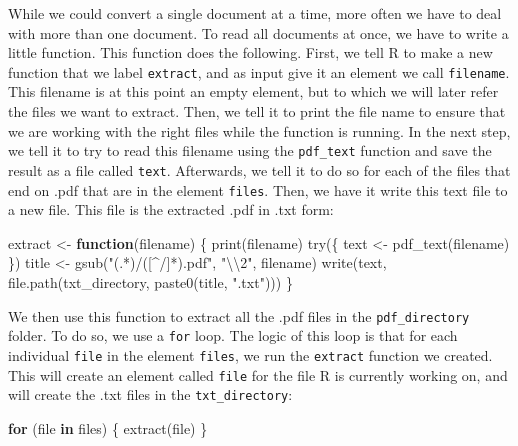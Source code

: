 \documentclass[
]{article}
\newenvironment{Shaded}{\begin{snugshade}}{\end{snugshade}}
\newcommand{\ControlFlowTok}[1]{\textcolor[rgb]{0.13,0.29,0.53}{\textbf{#1}}}
\newcommand{\FunctionTok}[1]{\textcolor[rgb]{0.00,0.00,0.00}{#1}}
\newcommand{\NormalTok}[1]{#1}
\newcommand{\OtherTok}[1]{\textcolor[rgb]{0.56,0.35,0.01}{#1}}
\newcommand{\SpecialCharTok}[1]{\textcolor[rgb]{0.00,0.00,0.00}{#1}}
\newcommand{\StringTok}[1]{\textcolor[rgb]{0.31,0.60,0.02}{#1}}
\begin{document}
While we could convert a single document at a time, more often we have to deal with more than one document. To read all documents at once, we have to write a little function. This function does the following. First, we tell R to make a new function that we label \texttt{extract}, and as input give it an element we call \texttt{filename}. This filename is at this point an empty element, but to which we will later refer the files we want to extract. Then, we tell it to print the file name to ensure that we are working with the right files while the function is running. In the next step, we tell it to try to read this filename using the \texttt{pdf\_text} function and save the result as a file called \texttt{text}. Afterwards, we tell it to do so for each of the files that end on .pdf that are in the element \texttt{files}. Then, we have it write this text file to a new file. This file is the extracted .pdf in .txt form:

\begin{Shaded}
\begin{Highlighting}[]
\NormalTok{extract }\OtherTok{\textless{}{-}} \ControlFlowTok{function}\NormalTok{(filename) \{}
    \FunctionTok{print}\NormalTok{(filename)}
    \FunctionTok{try}\NormalTok{(\{}
\NormalTok{        text }\OtherTok{\textless{}{-}} \FunctionTok{pdf\_text}\NormalTok{(filename)}
\NormalTok{    \})}
\NormalTok{    title }\OtherTok{\textless{}{-}} \FunctionTok{gsub}\NormalTok{(}\StringTok{"(.*)/([\^{}/]*).pdf"}\NormalTok{, }\StringTok{"}\SpecialCharTok{\textbackslash{}\textbackslash{}}\StringTok{2"}\NormalTok{, filename)}
    \FunctionTok{write}\NormalTok{(text, }\FunctionTok{file.path}\NormalTok{(txt\_directory, }\FunctionTok{paste0}\NormalTok{(title, }\StringTok{".txt"}\NormalTok{)))}
\NormalTok{\}}
\end{Highlighting}
\end{Shaded}

We then use this function to extract all the .pdf files in the \texttt{pdf\_directory} folder. To do so, we use a \texttt{for} loop. The logic of this loop is that for each individual \texttt{file} in the element \texttt{files}, we run the \texttt{extract} function we created. This will create an element called \texttt{file} for the file R is currently working on, and will create the .txt files in the \texttt{txt\_directory}:

\begin{Shaded}
\begin{Highlighting}[]
\ControlFlowTok{for}\NormalTok{ (file }\ControlFlowTok{in}\NormalTok{ files) \{}
    \FunctionTok{extract}\NormalTok{(file)}
\NormalTok{\}}
\end{Highlighting}
\end{Shaded}
\end{document}

